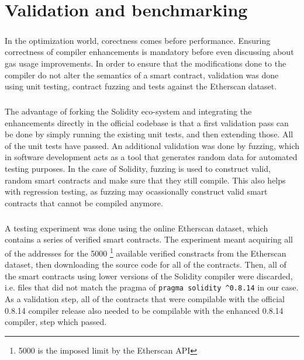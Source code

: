 \chapter{Validation and benchmarking}
\paragraph*{}
In the optimization world, corectness comes before performance. Ensuring correctness of compiler enhancements is mandatory before even discussing about gas usage improvements. In order to ensure that the modifications done to the compiler do not alter the semantics of a smart contract, validation was done using unit testing, contract fuzzing and tests against the Etherscan dataset.

\paragraph*{}
The advantage of forking the Solidity eco-system and integrating the enhancements directly in the official codebase is that a first validation pass can be done by simply running the existing unit tests, and then extending those. All of the unit tests have passed. An additional validation was done by fuzzing, which in software development acts as a tool that generates random data for automated testing purposes. In the case of Solidity, fuzzing is used to construct valid, random smart contracts and make sure that they still compile. This also helps with regression testing, as fuzzing may ocassionally construct valid smart contracts that cannot be compiled anymore.

\paragraph*{}
A testing experiment was done using the online Etherscan dataset, which contains a series of verified smart contracts. The experiment meant acquiring all of the addresses for the 5000 \footnote{5000 is the imposed limit by the Etherscan API} available verified constracts from the Etherscan dataset, then downloading the source code for all of the contracts. Then, all of the smart contracts using lower versions of the Solidity compiler were discarded, i.e. files that did not match the pragma of \lstinline[columns=fixed]{pragma solidity ^0.8.14} in our case. As a validation step, all of the contracts that were compilable with the official 0.8.14 compiler release also needed to be compilable with the enhanced 0.8.14 compiler, step which passed.

